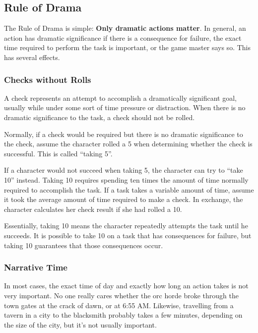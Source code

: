     \subsection{Rule of Drama}

        The Rule of Drama is simple: \textbf{Only dramatic actions matter}.
        In general, an action has dramatic significance if there is a consequence for failure, the exact time required to perform the task is important, or the game master says so.
        This has several effects.

        \subsubsection{Checks without Rolls}
            A check represents an attempt to accomplish a dramatically significant goal, usually while under some sort of time pressure or distraction.
            When there is no dramatic significance to the task, a check should not be rolled.

            \label{Taking 5}
            Normally, if a check would be required but there is no dramatic significance to the check, assume the character rolled a 5 when determining whether the check is successful.
            This is called ``taking 5''.

            \label{Taking 10}
            If a character would not succeed when taking 5, the character can try to ``take 10'' instead.
            Taking 10 requires spending ten times the amount of time normally required to accomplish the task.
            If a task takes a variable amount of time, assume it took the average amount of time required to make a check.
            In exchange, the character calculates her check result if she had rolled a 10.

            Essentially, taking 10 means the character repeatedly attempts the task until he succeeds.
            It is possible to take 10 on a task that has consequences for failure, but taking 10 guarantees that those consequences occur.

        \subsubsection{Narrative Time}
            In most cases, the exact time of day and exactly how long an action takes is not very important.
            No one really cares whether the orc horde broke through the town gates at the crack of dawn, or at 6:55 AM\@.
            Likewise, travelling from a tavern in a city to the blacksmith probably takes a few minutes, depending on the size of the city, but it's not usually important.

